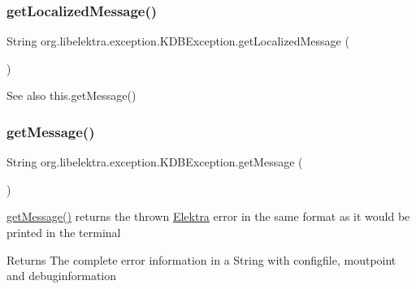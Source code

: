 \subsubsection{\texorpdfstring{get\+Localized\+Message()}{getLocalizedMessage()}}
{\footnotesize\ttfamily String org.\+libelektra.\+exception.\+K\+D\+B\+Exception.\+get\+Localized\+Message (\begin{DoxyParamCaption}{ }\end{DoxyParamCaption})\hspace{0.3cm}{\ttfamily [inline]}}

\begin{DoxySeeAlso}{See also}
this.\+get\+Message() 
\end{DoxySeeAlso}
\mbox{\label{classorg_1_1libelektra_1_1exception_1_1KDBException_a78bbf7b7767f90840ba6bdb22bebfe11}} 
\subsubsection{\texorpdfstring{get\+Message()}{getMessage()}}
{\footnotesize\ttfamily String org.\+libelektra.\+exception.\+K\+D\+B\+Exception.\+get\+Message (\begin{DoxyParamCaption}{ }\end{DoxyParamCaption})\hspace{0.3cm}{\ttfamily [inline]}}



\hyperlink{classorg_1_1libelektra_1_1exception_1_1KDBException_a78bbf7b7767f90840ba6bdb22bebfe11}{get\+Message()} returns the thrown \hyperlink{interfaceorg_1_1libelektra_1_1Elektra}{Elektra} error in the same format as it would be printed in the terminal 

\begin{DoxyReturn}{Returns}
The complete error information in a String with configfile, moutpoint and debuginformation 
\end{DoxyReturn}
\mbox{\label{classorg_1_1libelektra_1_1exception_1_1KDBException_a241bb6bc3b93677bc4b51d23b917f9d1}} 
